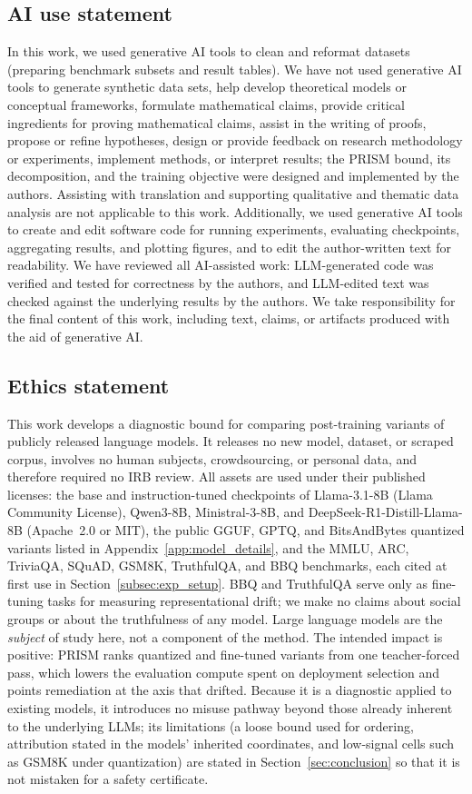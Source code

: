 \documentclass{article} %
\begin{document}
\subsection*{AI use statement}
In this work, we used generative AI tools to clean and reformat datasets
(preparing benchmark subsets and result tables). We have not used generative AI
tools to generate synthetic data sets, help develop theoretical models or
conceptual frameworks, formulate mathematical claims, provide critical
ingredients for proving mathematical claims, assist in the writing of proofs,
propose or refine hypotheses, design or provide feedback on research
methodology or experiments, implement methods, or interpret results; the PRISM
bound, its decomposition, and the training objective were designed and
implemented by the authors. Assisting with translation and supporting
qualitative and thematic data analysis are not applicable to this work.
Additionally, we used generative AI tools to create and edit software code for
running experiments, evaluating checkpoints, aggregating results, and plotting
figures, and to edit the author-written text for readability. We have reviewed
all AI-assisted work: LLM-generated code was verified and tested for correctness
by the authors, and LLM-edited text was checked against the underlying results
by the authors. We take responsibility
for the final content of this work, including text, claims, or artifacts
produced with the aid of generative AI.

\subsection*{Ethics statement}
This work develops a diagnostic bound for comparing post-training variants of
publicly released language models. It releases no new model, dataset, or
scraped corpus, involves no human subjects, crowdsourcing, or personal data,
and therefore required no IRB review. All assets are used under their published
licenses: the base and instruction-tuned checkpoints of Llama-3.1-8B (Llama
Community License), Qwen3-8B, Ministral-3-8B, and DeepSeek-R1-Distill-Llama-8B
(Apache~2.0 or MIT), the public GGUF, GPTQ, and BitsAndBytes quantized variants
listed in Appendix~\ref{app:model_details}, and the MMLU, ARC, TriviaQA, SQuAD,
GSM8K, TruthfulQA, and BBQ benchmarks, each cited at first use in
Section~\ref{subsec:exp_setup}. BBQ and TruthfulQA serve only as fine-tuning
tasks for measuring representational drift; we make no claims about social
groups or about the truthfulness of any model. Large language models are the
\emph{subject} of study here, not a component of the method. The intended
impact is positive: PRISM ranks quantized and fine-tuned variants from one
teacher-forced pass, which lowers the evaluation compute spent on deployment
selection and points remediation at the axis that drifted. Because it is a
diagnostic applied to existing models, it introduces no misuse pathway beyond
those already inherent to the underlying LLMs; its limitations (a loose bound
used for ordering, attribution stated in the models' inherited coordinates, and
low-signal cells such as GSM8K under quantization) are stated in
Section~\ref{sec:conclusion} so that it is not mistaken for a safety certificate.
\end{document}
